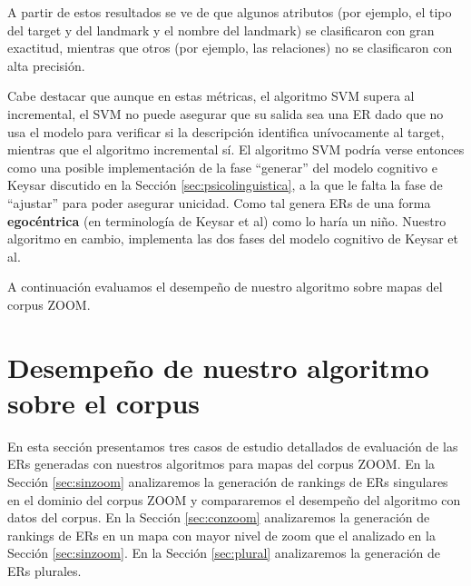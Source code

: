 
A partir de estos resultados se ve de que algunos atributos (por ejemplo, el tipo del target y del landmark y el nombre del landmark) se clasificaron con gran exactitud, mientras que otros (por ejemplo, las relaciones) no se clasificaron con alta precisi\'on.

Cabe destacar que aunque en estas m\'etricas, el algoritmo SVM supera al incremental, el SVM no puede asegurar que su salida sea una ER dado que no usa el modelo para verificar si la descripci\'on identifica un\'ivocamente al target, mientras que el algoritmo incremental s\'i. El algoritmo SVM podr\'ia verse entonces como una posible implementaci\'on de la fase ``generar'' del modelo cognitivo e Keysar \cite{keysar:Curr98} discutido en la Secci\'on \ref{sec:psicolinguistica}, a la que le falta la fase de ``ajustar'' para poder asegurar unicidad. Como tal genera ERs de una forma \textbf{egoc\'entrica} (en terminolog\'ia de Keysar et al) como lo har\'ia un ni\~no. Nuestro algoritmo en cambio, implementa las dos fases del modelo cognitivo de Keysar et al.

A continuaci\'on evaluamos el desempe\~no de nuestro algoritmo sobre mapas del corpus ZOOM.

\section{Desempe\~no de nuestro algoritmo sobre el corpus}
\label{sec:caso_estudio}

En esta secci\'on presentamos tres casos de estudio detallados de evaluaci\'on de las ERs generadas con nuestros algoritmos para mapas del corpus ZOOM. En la Secci\'on \ref{sec:sinzoom} analizaremos la generaci\'on de rankings de ERs singulares en el dominio del corpus ZOOM y compararemos el desempe\~no del algoritmo con datos del corpus. En la Secci\'on \ref{sec:conzoom} analizaremos la generaci\'on de rankings de ERs en un mapa con mayor nivel de zoom que el analizado en la Secci\'on \ref{sec:sinzoom}. En la Secci\'on \ref{sec:plural} analizaremos la generaci\'on de ERs plurales.


